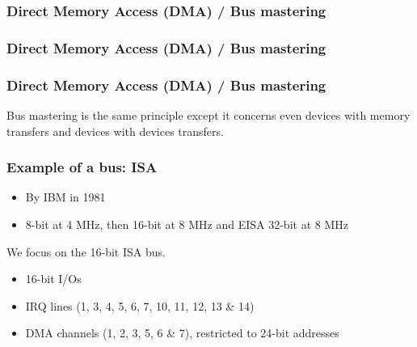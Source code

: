 
\begin{frame}
  \frametitle{Direct Memory Access (DMA) / Bus mastering}

  \begin{center}
  \end{center}

\end{frame}


\begin{frame}
  \frametitle{Direct Memory Access (DMA) / Bus mastering}

  \begin{center}
  \end{center}

\end{frame}


\begin{frame}
  \frametitle{Direct Memory Access (DMA) / Bus mastering}

  Bus mastering is the same principle except it concerns even devices
  with memory transfers and devices with devices transfers.

\end{frame}


\begin{frame}
  \frametitle{Example of a bus: ISA}

  \begin{itemize}
  \item
    By IBM in 1981
  \item
    8-bit at 4 MHz, then 16-bit at 8 MHz and EISA 32-bit at 8 MHz
  \end{itemize}

  \-

  We focus on the 16-bit ISA bus.

  \begin{itemize}
  \item
    16-bit I/Os
  \item
    IRQ lines (1, 3, 4, 5, 6, 7, 10, 11, 12, 13 \& 14)
  \item
    DMA channels (1, 2, 3, 5, 6 \& 7), restricted to 24-bit addresses
  \end{itemize}

\end{frame}


